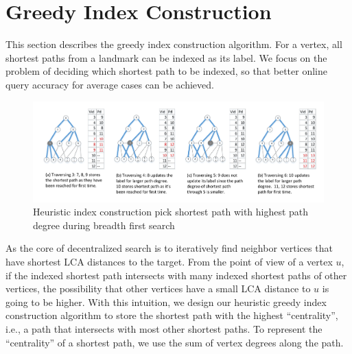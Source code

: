 \section{Greedy Index Construction}
\label{preprocessing}

This section describes the greedy index construction algorithm. For a vertex, all shortest paths from a landmark can be indexed as its label. We focus on the problem of deciding which shortest path to be indexed, so that better online query accuracy for average cases can be achieved. 

\begin{figure}[ht]
		\vspace{-1cm}
    \centering
    \includegraphics[width=\linewidth]{./figures/new_illustrate/bfs_illustrate.pdf}
		\vspace{-1cm}
    \caption{Heuristic index construction pick shortest path with highest path degree during breadth first search}
    \label{fig:bfs_illustrate}
		\vspace{-5mm}
\end{figure}

As the core of decentralized search is to iteratively find neighbor vertices that have shortest LCA distances to the target. From the point of view of a vertex $u$, if the indexed shortest path intersects with many indexed shortest paths of other vertices, the possibility that other vertices have a small LCA distance to $u$ is going to be higher. With this intuition, we design our heuristic greedy index construction algorithm to store the shortest path with the highest ``centrality'', i.e., a path that intersects with most other shortest paths. To represent the ``centrality'' of a shortest path, we use the sum of vertex degrees along the path. %

